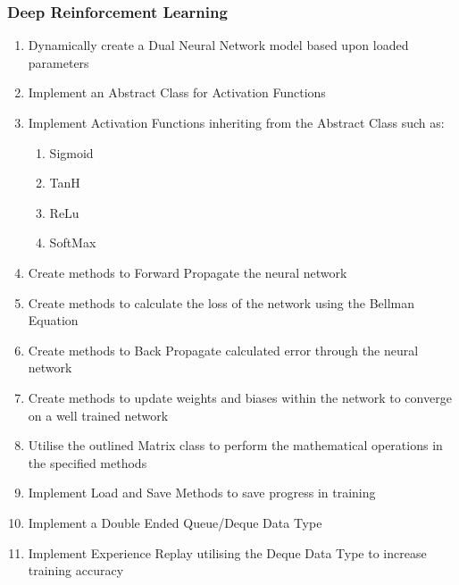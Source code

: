 \begin{flushleft}
            \subsubsection*{Deep Reinforcement Learning}
                \begin{enumerate}
                    \item Dynamically create a Dual Neural Network model based upon loaded parameters
                    \item Implement an Abstract Class for Activation Functions
                    \item Implement Activation Functions inheriting from the Abstract Class such as:
                    \begin{enumerate}
                        \item Sigmoid
                        \item TanH
                        \item ReLu
                        \item SoftMax
                    \end{enumerate}
                    \item Create methods to Forward Propagate the neural network
                    \item Create methods to calculate the loss of the network using the Bellman Equation
                    \item Create methods to Back Propagate calculated error through the neural network
                    \item Create methods to update weights and biases within the network to converge on a well trained network
                    \item Utilise the outlined Matrix class to perform the mathematical operations in the specified methods
                    \item Implement Load and Save Methods to save progress in training
                    \item Implement a Double Ended Queue/Deque Data Type
                    \item Implement Experience Replay utilising the Deque Data Type to increase training accuracy
                \end{enumerate}   

\end{flushleft}
